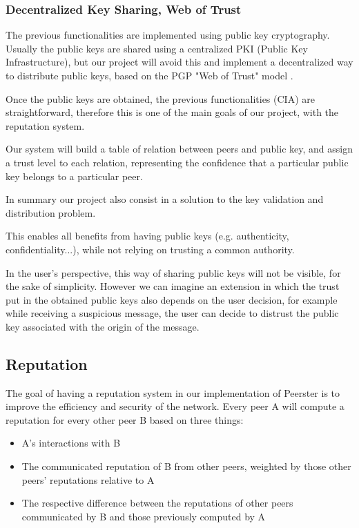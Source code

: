 \documentclass[]{article}
\begin{document}
            \subsubsection{Decentralized Key Sharing, Web of Trust}
            The previous functionalities are implemented using public key cryptography. Usually the public keys are shared using a centralized PKI (Public Key Infrastructure), but our project will avoid this and implement a decentralized way to distribute public keys, based on the PGP "Web of Trust" model \cite{abdul1997pgp}.
            
            Once the public keys are obtained, the previous functionalities (CIA) are straightforward, therefore this is one of the main goals of our project, with the reputation system.
            
            Our system will build a table of relation between peers and public key, and assign a trust level to each relation, representing the confidence that a particular public key belongs to a particular peer.
            
            In summary our project also consist in a solution to the key validation and distribution problem. 
            
            This enables all benefits from having public keys (e.g. authenticity, confidentiality...), while not relying on trusting a common authority. \newline
            
            In the user's perspective, this way of sharing public keys will not be visible, for the sake of simplicity. However we can imagine an extension in which the trust put in the obtained public keys also depends on the user decision, for example while receiving a suspicious message, the user can decide to distrust the public key associated with the origin of the message.
        
        \subsection{Reputation}
        The goal of having a reputation system in our implementation of Peerster is to improve the efficiency and security of the network.
        Every peer A will compute a reputation for every other peer B based on three things:
        
        \begin{itemize}
        \item A's interactions with B
        \item The communicated reputation of B from other peers, weighted by those other peers' reputations relative to A
        \item The respective difference between the reputations of other peers communicated by B and those previously computed by A
        \end{itemize}
        
\end{document}
